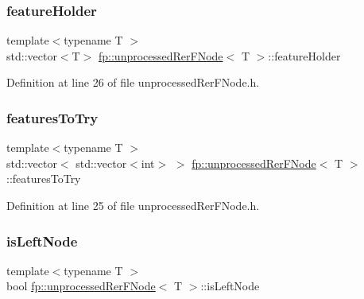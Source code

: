 \subsubsection{\texorpdfstring{feature\+Holder}{featureHolder}}
{\footnotesize\ttfamily template$<$typename T $>$ \\
std\+::vector$<$T$>$ \hyperlink{classfp_1_1unprocessedRerFNode}{fp\+::unprocessed\+Rer\+F\+Node}$<$ T $>$\+::feature\+Holder\hspace{0.3cm}{\ttfamily [protected]}}



Definition at line 26 of file unprocessed\+Rer\+F\+Node.\+h.

\mbox{\label{classfp_1_1unprocessedRerFNode_aa2028578f341c8f41cf000eb40d228f2}} 
\subsubsection{\texorpdfstring{features\+To\+Try}{featuresToTry}}
{\footnotesize\ttfamily template$<$typename T $>$ \\
std\+::vector$<$ std\+::vector$<$int$>$ $>$ \hyperlink{classfp_1_1unprocessedRerFNode}{fp\+::unprocessed\+Rer\+F\+Node}$<$ T $>$\+::features\+To\+Try\hspace{0.3cm}{\ttfamily [protected]}}



Definition at line 25 of file unprocessed\+Rer\+F\+Node.\+h.

\mbox{\label{classfp_1_1unprocessedRerFNode_a75fe4b426a6a1cc8bb1de50380dcec94}} 
\subsubsection{\texorpdfstring{is\+Left\+Node}{isLeftNode}}
{\footnotesize\ttfamily template$<$typename T $>$ \\
bool \hyperlink{classfp_1_1unprocessedRerFNode}{fp\+::unprocessed\+Rer\+F\+Node}$<$ T $>$\+::is\+Left\+Node\hspace{0.3cm}{\ttfamily [protected]}}



